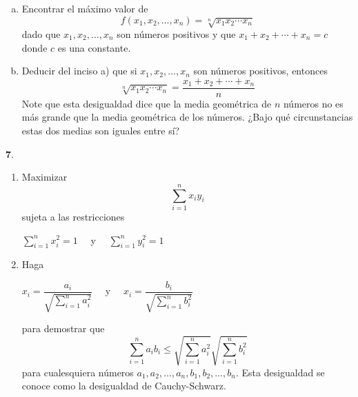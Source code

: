 \documentclass[fleqn, 12pt]{article}
\begin{document}
\begin{list}{\bfseries Ejercicio}{ \addtolength{\itemindent}{-1mm}%
    \addtolength{\labelsep}{-1mm}%
    \addtolength{\leftmargin}{-1cm}%
    \addtolength{\labelwidth}{-1cm} }
    \begin{enumerate}[a)]
        \item Encontrar el máximo valor de 
        $$ f(x_1, x_2, \ldots , x_n) = \sqrt[n]{\displaystyle x_1 x_2 \cdots x_n} $$
        dado que $ x_1, x_2, \ldots , x_n $ son números positivos y que $ x_1 + x_2 + \cdots + x_n = c $ donde $ c $ es una constante.


        \item Deducir del inciso a) que si $ x_1, x_2, \ldots , x_n $ son números positivos, entonces 
        $$ \sqrt[n]{\displaystyle x_1 x_2 \cdots x_n} = \dfrac{x_1 + x_2 + \cdots + x_n}{n} $$
        Note que esta desigualdad dice que la media geométrica de $ n $ números no es más grande que la media geométrica de los números. ¿Bajo qué circunstancias estas dos medias son iguales entre sí?

    \end{enumerate}
    
    \item $ \mathbf{7.} $ 
    
    \begin{enumerate}
        \item Maximizar 
        $$ \sum_{i = 1}^{n} x_i y_i $$
        sujeta a las restricciones

        $ \displaystyle \sum_{i = 1}^{n} x_i^2 = 1 \quad $ y $ \displaystyle \quad \sum_{i = 1}^{n} y_i^2 = 1 $


        \item Haga 
            
        $ x_i = \dfrac{a_i}{\sqrt{\displaystyle \sum_{i = 1}^{n} a_i^2}} \quad $ y $ \quad x_i = \dfrac{b_i}{\sqrt{\displaystyle \sum_{i = 1}^{n} b_i^2}} $

        para demostrar que 
        $$ \sum_{i = 1}^{n} a_i b_i \leq \sqrt{\displaystyle \sum_{i = 1}^{n} a_i^2} \sqrt{\displaystyle \sum_{i = 1}^{n} b_i^2} $$
        para cualesquiera números $ a_1, a_2, \ldots , a_n, b_1, b_2, \ldots , b_n $. Esta desigualdad se conoce como la desigualdad de Cauchy-Schwarz.
    \end{enumerate}
\end{list}
\end{document}

